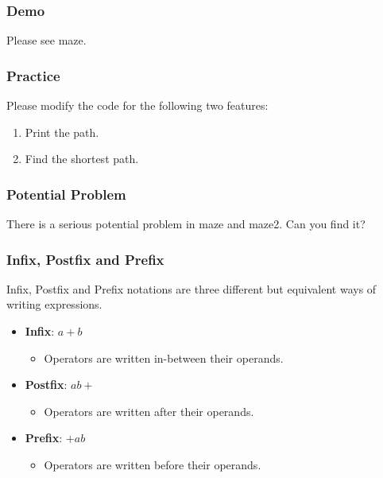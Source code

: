 \documentclass[11pt]{beamer}
\begin{document}
\begin{frame}
\frametitle{Demo}
Please see maze.
\end{frame}

\begin{frame}
\frametitle{Practice}
Please modify the code for the following two features:
\begin{enumerate}
\item Print the path. 
\item Find the shortest path.
\end{enumerate}
\end{frame}

\begin{frame}
\frametitle{Potential Problem}
There is a serious potential problem in maze and maze2. Can you find it?

\end{frame}

\begin{frame}
\frametitle{Infix, Postfix and Prefix}
Infix, Postfix and Prefix notations are three different but {\color{purple}equivalent} ways of writing expressions.
\begin{itemize}
\item {\bf\color{blue}Infix}: $a+b$
    \begin{itemize}
    \item Operators are written in-between their operands.
    \end{itemize}
\item {\bf\color{blue}Postfix}: $ab+$
    \begin{itemize}
    \item Operators are written after their operands. 
    \end{itemize}
\item {\bf\color{blue}Prefix}: $+ab$
    \begin{itemize}
    \item Operators are written before their operands.
    \end{itemize}
\end{itemize}
\end{frame}
\end{document}
